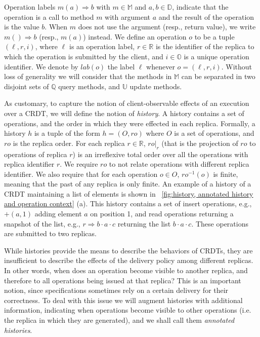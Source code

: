 Operation labels \mbox{$m(a)\Rightarrow b$} with $m \in \mathbb{M}$ and $a,b \in
\mathbb{D}$, indicate that the operation is a call to method $m$
with argument $a$ and the result of the operation is the value
$b$.
When $m$ does not use the argument (resp., return value), we write
$m()\Rightarrow b$ (resp., $m(a)$) instead.
We define an operation $o$ to be a tuple $(\ell,r,i)$, where $\ell$ is
an operation label, $r \in \mathbb{R}$ is the identifier of the
replica to which the operation is submitted by the client, and $i \in \mathbb{O}$ is a
unique operation identifier.
We denote by $\mathit{lab}(o)$ the label $\ell$ whenever $o = (\ell,
r, i)$.
%
Without loss of generality we will consider that the methods in
$\mathbb{M}$ can be separated in two disjoint sets of $\mathbb{Q}$
query methods, and $\mathbb{U}$ update methods.

As customary, to capture the notion of client-observable effects of an
execution over a CRDT, we will define the notion of \emph{history}.
%
A history contains a set of operations, and the order in which
they were effected in each replica.
%
Formally, a history $h$ is a tuple of the form $h = (O,\mathit{ro})$
where $O$ is a set of operations, and $\mathit{ro}$ is the replica
order.
%
For each replica $r \in \mathbb{R}$, $\mathit{ro}|_{r}$ (that is the
projection of $ro$ to operations of replica $r$) is an irreflexive
total order over all the operations with replica identifier $r$.
%
We require $\mathit{ro}$ to not relate operations with different replica identifier.
%
We also require that for each operation $o \in O$,
$\mathit{ro}^{-1}(o)$ is finite, meaning that the past of any replica
is only finite.
An example of a history of a CRDT maintaining a list of elements is shown in
\figurename~\ref{fig:history, annotated history and operation context} (a).
This history contains a set of insert operations, e.g., $+(a,1)$ adding element $a$
on position 1, and read operations returning a snapshot of the list, e.g., $r\Rightarrow b\cdot a \cdot c$
returning the list $b\cdot a \cdot c$. These operations are submitted to two replicas.

While histories provide the means to describe the behaviors of CRDTs,
they are insufficient to describe the effects of the delivery
policy among different replicas.
%
In other words, when does an operation become visible to another
replica, and therefore to all operations being issued at that replica?
%
This is an important notion, since specifications sometimes rely on a
certain delivery for their correctness.
%
To deal with this issue we will augment histories with additional
information, indicating when operations become visible to other
operations (i.e. the replica in which they are generated), and we
shall call them \emph{annotated histories}.
%

